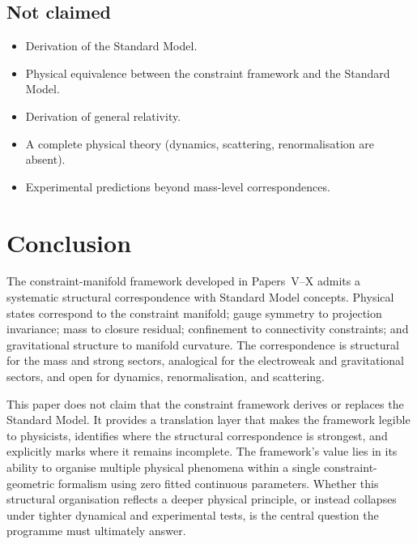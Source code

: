 \documentclass[12pt]{article}
\begin{document}
\subsection*{Not claimed}

\begin{itemize}
    \item Derivation of the Standard Model.
    \item Physical equivalence between the constraint framework and the Standard Model.
    \item Derivation of general relativity.
    \item A complete physical theory (dynamics, scattering, renormalisation are absent).
    \item Experimental predictions beyond mass-level correspondences.
\end{itemize}

\section{Conclusion}\label{sec:conclusion}

The constraint-manifold framework developed in Papers~V--X admits a systematic structural correspondence with Standard Model concepts. Physical states correspond to the constraint manifold; gauge symmetry to projection invariance; mass to closure residual; confinement to connectivity constraints; and gravitational structure to manifold curvature. The correspondence is structural for the mass and strong sectors, analogical for the electroweak and gravitational sectors, and open for dynamics, renormalisation, and scattering.

This paper does not claim that the constraint framework derives or replaces the Standard Model. It provides a translation layer that makes the framework legible to physicists, identifies where the structural correspondence is strongest, and explicitly marks where it remains incomplete. The framework's value lies in its ability to organise multiple physical phenomena within a single constraint-geometric formalism using zero fitted continuous parameters. Whether this structural organisation reflects a deeper physical principle, or instead collapses under tighter dynamical and experimental tests, is the central question the programme must ultimately answer.



\end{document}
